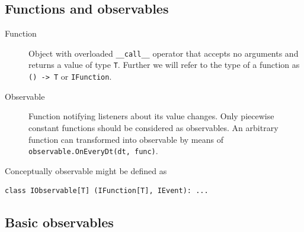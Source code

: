 \documentclass[a4paper,11pt]{article}
\begin{document}
\subsection{Functions and observables}\label{functions-and-observables}

\begin{description}
\item[Function]
Object with overloaded \texttt{\_\_call\_\_} operator that accepts no
arguments and returns a value of type \texttt{T}. Further we will refer
to the type of a function as \texttt{() -\textgreater{} T} or
\texttt{IFunction}.
\item[Observable]
Function notifying listeners about its value changes. Only piecewise
constant functions should be considered as observables. An arbitrary
function can transformed into observable by means of
\texttt{observable.OnEveryDt(dt, func)}.
\end{description}

Conceptually observable might be defined as

\begin{verbatim}
class IObservable[T] (IFunction[T], IEvent): ...
\end{verbatim}
\subsection{Basic observables}\label{basic-observables}
\end{document}
